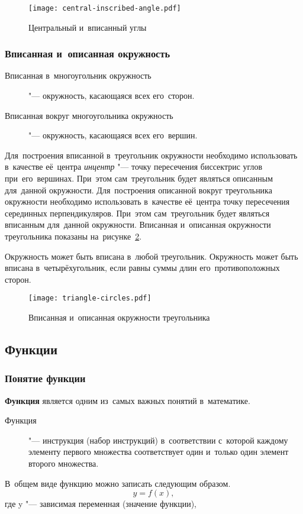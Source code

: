 \documentclass[]{scrartcl}
\begin{document}
\begin{figure}[ht]
	\centering %
	\texttt{[image: central-inscribed-angle.pdf]}
	\caption{Центральный и~вписанный углы}\label{fig:central-inscribed-angle}
\end{figure}

\subsubsection{Вписанная и~описанная окружность}
\begin{description}
	\item[Вписанная в~многоугольник окружность] "--- окружность, касающаяся всех его~сторон.
\end{description}
\begin{description}
	\item[Вписанная вокруг многоугольника окружность] "--- окружность, касающаяся всех его~вершин.
\end{description}
Для~построения вписанной в~треугольник окружности необходимо использовать в~качестве её~центра \emph{инцентр} "--- точку пересечения биссектрис углов при~его~вершинах. При~этом сам~треугольник будет являться описанным для~данной окружности. Для~построения описанной вокруг треугольника окружности необходимо использовать в~качестве её~центра  точку пересечения серединных перпендикуляров. При~этом сам~треугольник будет являться вписанным для~данной окружности. Вписанная и~описанная окружности треугольника показаны на~рисунке~\ref{fig:triangle-circles}.

Окружность может быть вписана в~любой треугольник. Окружность может быть вписана в~четырёхугольник, если равны суммы длин его~противоположных сторон.

\begin{figure}[ht]
	\centering %
\texttt{[image: triangle-circles.pdf]}
\caption{Вписанная и~описанная окружности треугольника}\label{fig:triangle-circles}
\end{figure}

\subsection{Функции}
\subsubsection{Понятие функции}
\textbf{Функция} является одним из~самых важных понятий в~математике.
\begin{description}
	\item[Функция] "--- инструкция (набор инструкций) в~соответствии с~которой каждому элементу первого множества соответствует один и~только один элемент второго множества.
\end{description}
В~общем виде функцию можно записать следующим образом.
\begin{equation}\label{function}
y=f(x),
\end{equation}
где y "--- зависимая переменная (значение функции),
\end{document}

